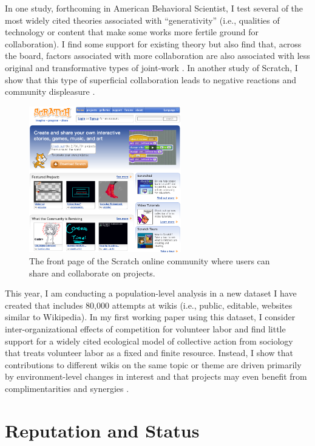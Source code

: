 \documentclass[10pt]{memoir}
\begin{document}
In one study, forthcoming in American Behavioral Scientist, I test
several of the most widely cited theories associated with
``generativity'' (i.e., qualities of technology or content that make
some works more fertile ground for collaboration). I find some support
for existing theory but also find that, across the board, factors
associated with more collaboration are also associated with less
original and transformative types of joint-work
\cite{hill_remixing_2012}. In another study of Scratch, I show that
this type of superficial collaboration leads to negative reactions and
community displeasure \cite{hill_responses_2010}.

\begin{figure}
 \begin{centering}
 \includegraphics[width=2.6in]{figures/frontpage_modified-topremix.png}
  \caption{The front page of the Scratch online community where users
    can share and collaborate on projects.}
 \label{fig:scratchfrontpage}
 \end{centering}
 \vspace{-2em}
\end{figure}

This year, I am conducting a population-level analysis in a new
dataset I have created that includes 80,000 attempts at wikis (i.e.,
public, editable, websites similar to Wikipedia). In my first working
paper using this dataset, I consider inter-organizational effects of
competition for volunteer labor and find little support for a widely
cited ecological model of collective action from sociology that treats
volunteer labor as a fixed and finite resource. Instead, I show that
contributions to different wikis on the same topic or theme are driven
primarily by environment-level changes in interest and that projects
may even benefit from complimentarities and synergies
\cite{hill_is_2012}.

\section{Reputation and Status}
\end{document}
